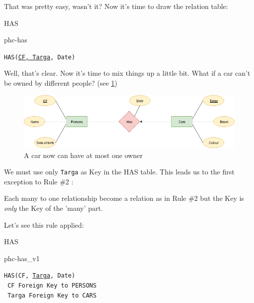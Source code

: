 \documentclass[12pt, oneside]{report}
\newcommand\tab[1][1cm]{\hspace*{#1}}
\begin{document}
\bigskip
That was pretty easy, wasn't it? Now it's time to draw the relation table:
\vskip 20pt

\begin{center}
	HAS
	\begin{table}[H]
		\centering
		{phc-has}
	\end{table}
	\texttt{HAS(\underline{CF, Targa}, Date)}
\end{center}

\vskip 20pt
Well, that's clear. Now it's time to mix things up a little bit.
What if a car can't be owned by different people? (see \ref{diagram1_01})
\begin{figure}[H]
	\centering
	\includegraphics[width=\textwidth,keepaspectratio]{diagram1_01.png}
	\caption{A car now can have at most one owner}
	\label{diagram1_01}
\end{figure}
We must use only \texttt{Targa} as Key in the HAS table. This leads us to the first exception to Rule \#2	:

Each many to one relationship become a relation as in Rule \#2 but the Key is \emph{only} the Key of the 'many' part.

Let's see this rule applied:
\vskip 20pt
\begin{minipage}[c]{0.45\textwidth}
	\begin{center}
		HAS
		\begin{table}[H]
			\centering
			{phc-has_v1}
		\end{table}
	\end{center}
\end{minipage}
\hspace{.05\textwidth}
\begin{minipage}[c]{0.50\textwidth}
	\texttt{HAS(CF, \underline{Targa}, Date)}\\
	\tab[.4cm] \texttt{	CF Foreign Key to PERSONS}\\
	\tab[.4cm] \texttt{	Targa Foreign Key to CARS}
\end{minipage}
\end{document}
